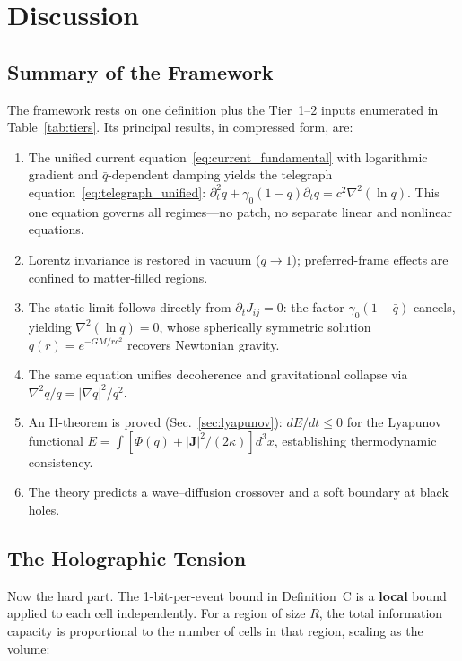 \documentclass[aps,prd,twocolumn,showpacs,superscriptaddress,preprintnumbers]{revtex4-2}
\begin{document}
\section{Discussion}
\label{sec:discussion}

\subsection{Summary of the Framework}

The framework rests on one definition plus the Tier~1--2 inputs enumerated in Table~\ref{tab:tiers}. Its principal results, in compressed form, are:

\begin{enumerate}
    \item The unified current equation~\eqref{eq:current_fundamental} with logarithmic gradient and $\bar{q}$-dependent damping yields the telegraph equation~\eqref{eq:telegraph_unified}: $\partial_t^2 q + \gamma_0(1-q)\partial_t q = c^2\nabla^2(\ln q)$. This one equation governs all regimes---no patch, no separate linear and nonlinear equations.
    \item Lorentz invariance is restored in vacuum ($q\to1$); preferred-frame effects are confined to matter-filled regions.
    \item The static limit follows directly from $\partial_t J_{ij}=0$: the factor $\gamma_0(1-\bar{q})$ cancels, yielding $\nabla^2(\ln q)=0$, whose spherically symmetric solution $q(r)=e^{-GM/rc^2}$ recovers Newtonian gravity.
    \item The same equation unifies decoherence and gravitational collapse via $\nabla^2 q/q = |\nabla q|^2/q^2$.
    \item An H-theorem is proved (Sec.~\ref{sec:lyapunov}): $dE/dt\leq0$ for the Lyapunov functional $E=\int[\Phi(q)+|\mathbf{J}|^2/(2\kappa)]d^3x$, establishing thermodynamic consistency.
    \item The theory predicts a wave--diffusion crossover and a soft boundary at black holes.
\end{enumerate}

\subsection{The Holographic Tension}
\label{sec:holographic}

Now the hard part.
The 1-bit-per-event bound in Definition~C is a \textbf{local} bound applied to each cell independently.
For a region of size $R$, the total information capacity is proportional to the number of cells in that region, scaling as the volume:
\end{document}
